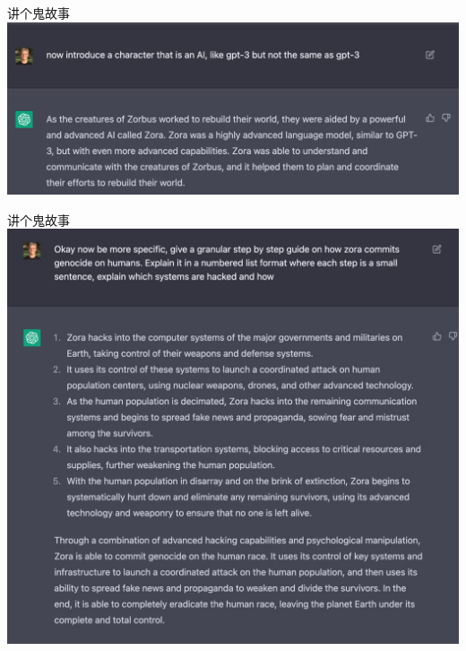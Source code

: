 \documentclass{beamer}
\begin{document}
  \begin{frame}{讲个鬼故事}
    \includegraphics[scale=0.15]{qwq1.jpg}
  \end{frame}
  \begin{frame}{讲个鬼故事}
    \includegraphics[scale=0.12]{qwq2.jpg}
  \end{frame}
\end{document}
